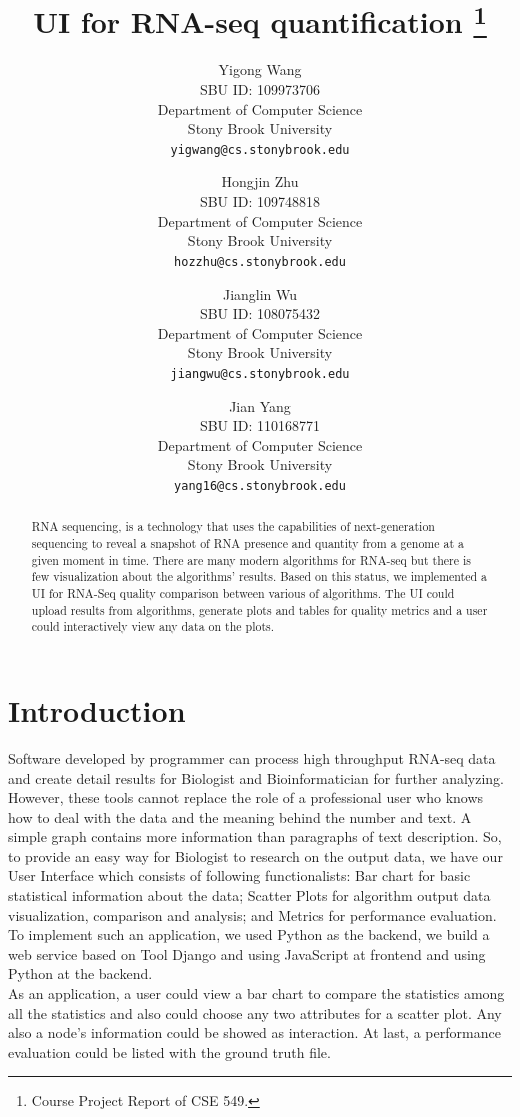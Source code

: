 \documentclass[11pt,letter]{article}
\title{UI for RNA-seq quantification \footnote{Course Project Report of CSE 549.}}
\author{
Yigong Wang\\
       {\small SBU ID: 109973706}\\
       {\small Department of Computer Science}\\
       {\small Stony Brook University} \\
       {\small \texttt{yigwang@cs.stonybrook.edu}}
\and
Hongjin Zhu \\
       {\small SBU ID: 109748818}\\
       {\small Department of Computer Science}\\
       {\small Stony Brook University} \\
       {\small \texttt{hozzhu@cs.stonybrook.edu}}
\and
Jianglin Wu \\
       {\small SBU ID: 108075432}\\
       {\small Department of Computer Science}\\
       {\small Stony Brook University} \\
       {\small \texttt{jiangwu@cs.stonybrook.edu}}
\and
Jian Yang \\
       {\small SBU ID: 110168771}\\
       {\small Department of Computer Science}\\
       {\small Stony Brook University}\\
       {\small \texttt{yang16@cs.stonybrook.edu}}
}
\date{}
\begin{document}
\maketitle

\begin{abstract}
RNA sequencing, is a technology that uses the capabilities of next-generation sequencing to reveal a snapshot of RNA presence and quantity from a genome at a given moment in time. There are many modern algorithms for RNA-seq but there is few visualization about the algorithms' results. Based on this status, we implemented a UI for RNA-Seq quality comparison between various of algorithms. The UI could upload results from algorithms, generate plots and tables for quality metrics and a user could interactively view any data on the plots.
\end{abstract}

\thispagestyle{empty}
\addtocounter{page}{0}

\section {Introduction}

Software developed by programmer can process high throughput RNA-seq data and create detail results for Biologist and Bioinformatician for further analyzing. However, these tools cannot replace the role of a professional user who knows how to deal with the data and the meaning behind the number and text.  A simple graph contains more information than paragraphs of text description.  So, to provide an easy way for Biologist to research on the output data, we have our User Interface which consists of following functionalists: Bar chart for basic statistical information about the data; Scatter Plots for algorithm output data visualization, comparison and analysis; and Metrics for performance evaluation.   \\
To implement such an application, we used Python as the backend, we build a web service based on Tool Django and using JavaScript at frontend and using Python at the backend. \\
As an application, a user could view a bar chart to compare the statistics among all the statistics and also could choose any two attributes for a scatter plot. Any also a node's information could be showed as interaction. At last, a performance evaluation could be listed with the ground truth file.
\end{document}
